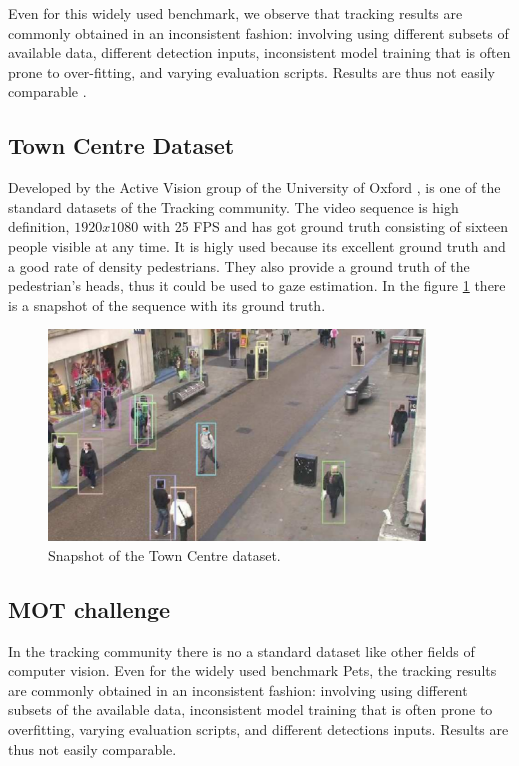 Even for this widely used benchmark, we observe that tracking results are commonly obtained in an inconsistent fashion: involving using different subsets of available data, different detection inputs, inconsistent model training that is often prone to over-fitting, and varying evaluation scripts. Results are thus not easily comparable \cite{mot}.


\subsection{Town Centre Dataset}

Developed by the Active Vision group of the University of Oxford \cite{townCenter}, is one of the standard datasets of the Tracking community. The video sequence is high definition, $1920x1080$ with 25 FPS and has got ground truth consisting of sixteen people visible at any time. It is higly used because its excellent ground truth and a good rate of density pedestrians. They also provide a ground truth of the pedestrian's heads, thus it could be used to gaze estimation. In the figure \ref{townce} there is a snapshot of the sequence with its ground truth.


\begin{figure}[H]
\centering         
\includegraphics[width=10cm]{datasetExample/raulselecio.png}
\caption{Snapshot of the Town Centre dataset.} \label{townce}
\end{figure}



\subsection{MOT challenge}


In the tracking community there is no a standard dataset like other fields of computer vision. Even for the widely used benchmark Pets, the tracking results are commonly obtained in an inconsistent fashion: involving using different subsets of the available data, inconsistent model training that is often prone to overfitting, varying evaluation scripts, and different detections inputs. Results are thus not easily comparable. 

